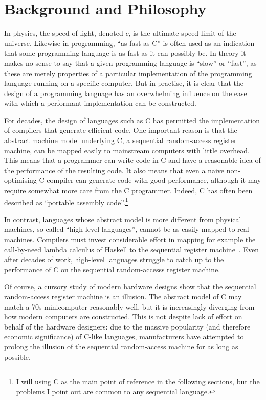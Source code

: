 \chapter{Background and Philosophy}
\label{chap:philosophy}

In physics, the speed of light, denoted $c$, is the ultimate speed
limit of the universe.  Likewise in programming, ``as fast as C'' is
often used as an indication that some programming language is as fast
as it can possibly be.  In theory it makes no sense to say that a
given programming language is ``slow'' or ``fast'', as these are
merely properties of a particular implementation of the programming
language running on a specific computer.  But in practise, it is clear
that the design of a programming language has an overwhelming
influence on the ease with which a performant implementation can be
constructed.

For decades, the design of languages such as C has permitted the
implementation of compilers that generate efficient code.  One
important reason is that the abstract machine model underlying C, a
sequential random-access register machine, can be mapped easily to
mainstream computers with little overhead.  This means that a
programmer can write code in C and have a reasonable idea of the
performance of the resulting code.  It also means that even a naive
non-optimising C compiler can generate code with good performance,
although it may require somewhat more care from the C programmer.
Indeed, C has often been described as ``portable assembly
code''.\footnote{I will using C as the main point of reference in the
  following sections, but the problems I point out are common to any
  sequential language.}

In contrast, languages whose abstract model is more different from
physical machines, so-called ``high-level languages'', cannot be as
easily mapped to real machines.  Compilers must invest considerable
effort in mapping for example the call-by-need lambda calculus of Haskell to
the sequential register machine~\cite{jones1992implementing}.  Even
after decades of work, high-level languages struggle to catch up to
the performance of C on the sequential random-accesss register
machine.

Of course, a cursory study of modern hardware designs show that the
sequential random-access register machine is an illusion.  The abstract
model of C may match a 70s minicomputer reasonably well, but it is
increasingly diverging from how modern computers are constructed.
This is not despite lack of effort on behalf of the hardware
designers: due to the massive popularity (and therefore economic
significance) of C-like languages, manufacturers have attempted to
prolong the illusion of the sequential random-access machine for as long as
possible.


